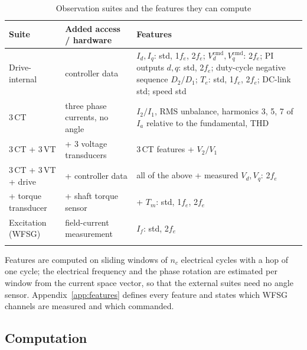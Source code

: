 \begin{table}[t]
\tabsize
\setlength{\tabcolsep}{4pt}
\caption{Observation suites and the features they can compute}\label{tab:suitedef}
\begin{tabular}{@{}p{2.3cm}p{3.0cm}p{7.0cm}@{}}
\toprule
Suite & Added access / hardware & Features \\
\midrule
Drive-internal & controller data & $I_d, I_q$: std, 1$f_e$, 2$f_e$; $V_d^{\mathrm{cmd}}, V_q^{\mathrm{cmd}}$: 2$f_e$; PI outputs $d,q$: std, 2$f_e$; duty-cycle negative sequence $D_2/D_1$; $T_e$: std, 1$f_e$, 2$f_e$; DC-link std; speed std \\
3\,CT & three phase currents, no angle & $I_2/I_1$, RMS unbalance, harmonics 3, 5, 7 of $I_a$ relative to the fundamental, THD \\
3\,CT + 3\,VT & + 3 voltage transducers & 3\,CT features + $V_2/V_1$ \\
3\,CT + 3\,VT + drive & + controller data & all of the above + measured $V_d, V_q$: 2$f_e$ \\
+ torque transducer & + shaft torque sensor & + $T_m$: std, 1$f_e$, 2$f_e$ \\
Excitation (WFSG) & field-current measurement & $I_f$: std, 2$f_e$ \\
\botrule
\end{tabular}
\end{table}

Features are computed on sliding windows of $n_c$ electrical cycles with a hop of one cycle; the electrical frequency and the phase rotation are estimated per window from the current space vector, so that the external suites need no angle sensor. Appendix~\ref{app:features} defines every feature and states which WFSG channels are measured and which commanded.

\subsection{Computation}\label{sec:computation}

